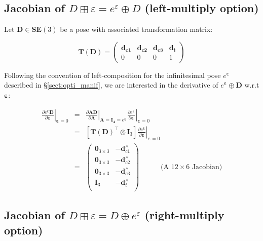 \documentclass[a4paper,11pt]{report}
\newcommand{\E}{{\bm{\varepsilon}}}
\newcommand{\hatop}[1]{#1^\wedge}
\begin{document}
\subsection{Jacobian of $D\boxplus \varepsilon = e^\varepsilon \oplus D$ (left-multiply option)}
\label{sect:jacob_eD}

Let $\mathbf{D} \in \mathbf{SE}(3)$ be a pose with associated transformation matrix:

\begin{equation}
\mathbf{T}(\mathbf{D}) =
\left(
\begin{array}{ccc|c}
 \mathbf{d_{c1}}  & \mathbf{d_{c2}}  & \mathbf{d_{c3}}  & \mathbf{d_{t}}  \\
\hline
  0 & 0 & 0 & 1
\end{array}
\right)
\end{equation}

Following the convention of left-composition for the infinitesimal
pose $e^\E$ described in \S\ref{sect:opti_manif},
we are interested in the derivative of $e^\E \oplus \mathbf{D}$ w.r.t $\E$:

\begin{eqnarray}
\left. \frac{\partial e^\E \mathbf{D}}{\partial \E} \right|_{\E = 0}
&=&
\left. \frac{\partial \mathbf{A} \mathbf{D}}{\partial \mathbf{A} } \right|_{\mathbf{A}=\mathbf{I_4} = e^\E}
\left. \frac{\partial e^\E}{\partial \E} \right|_{\E=0}
\\
&=&
\left[ \mathbf{T}(\mathbf{D})^\top \otimes  \mathbf{I}_3 \right]
\left. \frac{\partial e^\E}{\partial \E} \right|_{\E=0}
\\
&=&
\left(
\begin{array}{cc}
 \mathbf{0}_{3\times 3}  & -\hatop{\mathbf{d}}_{c1} \\
 \mathbf{0}_{3\times 3}  & -\hatop{\mathbf{d}}_{c2} \\
 \mathbf{0}_{3\times 3}  & -\hatop{\mathbf{d}}_{c3} \\
 \mathbf{I}_{3}  & -\hatop{\mathbf{d}}_{t} \\
\end{array}
\right)
\quad\quad\quad \text{(A $12 \times 6$ Jacobian)}
\end{eqnarray}

\newpage

\subsection{Jacobian of $D\boxplus \varepsilon = D \oplus e^\varepsilon$  (right-multiply option)}
\label{sect:jacob_De}
\end{document}

